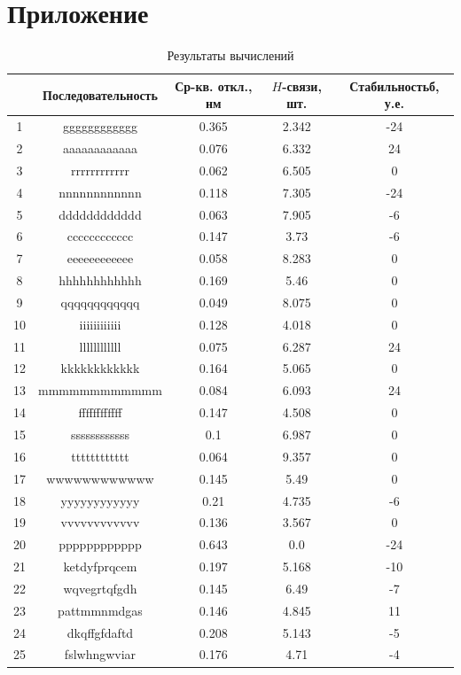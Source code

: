 \documentclass[
11pt,%
tightenlines,%
twoside,%
onecolumn,%
nofloats,%
nobibnotes,%
nofootinbib,%
superscriptaddress,%
noshowpacs,%
centertags]%
{revtex4}
\begin{document}
\newpage
\section{Приложение}
\label{sec:addition}

\begin{table}[h]
	\begin{tabular}{|c|c|c|c|c|}
		\hline
		 & Последовательность & Ср-кв. откл., нм & $H$-связи, шт. & Стабильностьб, у.е. \\ \hline
		1 & gggggggggggg & 0.365 & 2.342 & -24 \\ \hline 
		2 & aaaaaaaaaaaa & 0.076 & 6.332 & 24 \\ \hline 
		3 & rrrrrrrrrrrr & 0.062 & 6.505 & 0 \\ \hline 
		4 & nnnnnnnnnnnn & 0.118 & 7.305 & -24 \\ \hline 
		5 & dddddddddddd & 0.063 & 7.905 & -6 \\ \hline 
		6 & cccccccccccc & 0.147 & 3.73 & -6 \\ \hline 
		7 & eeeeeeeeeeee & 0.058 & 8.283 & 0 \\ \hline 
		8 & hhhhhhhhhhhh & 0.169 & 5.46 & 0 \\ \hline 
		9 & qqqqqqqqqqqq & 0.049 & 8.075 & 0 \\ \hline 
		10 & iiiiiiiiiiii & 0.128 & 4.018 & 0 \\ \hline 
		11 & llllllllllll & 0.075 & 6.287 & 24 \\ \hline 
		12 & kkkkkkkkkkkk & 0.164 & 5.065 & 0 \\ \hline 
		13 & mmmmmmmmmmmm & 0.084 & 6.093 & 24 \\ \hline 
		14 & ffffffffffff & 0.147 & 4.508 & 0 \\ \hline 
		15 & ssssssssssss & 0.1 & 6.987 & 0 \\ \hline 
		16 & tttttttttttt & 0.064 & 9.357 & 0 \\ \hline 
		17 & wwwwwwwwwwww & 0.145 & 5.49 & 0 \\ \hline 
		18 & yyyyyyyyyyyy & 0.21 & 4.735 & -6 \\ \hline 
		19 & vvvvvvvvvvvv & 0.136 & 3.567 & 0 \\ \hline 
		20 & pppppppppppp & 0.643 & 0.0 & -24 \\ \hline 
		21 & ketdyfprqcem & 0.197 & 5.168 & -10 \\ \hline 
		22 & wqvegrtqfgdh & 0.145 & 6.49 & -7 \\ \hline 
		23 & pattmmnmdgas & 0.146 & 4.845 & 11 \\ \hline 
		24 & dkqffgfdaftd & 0.208 & 5.143 & -5 \\ \hline 
		25 & fslwhngwviar & 0.176 & 4.71 & -4 \\ \hline 

	\end{tabular}
	\caption{Результаты вычислений}
\end{table}
\end{document}
